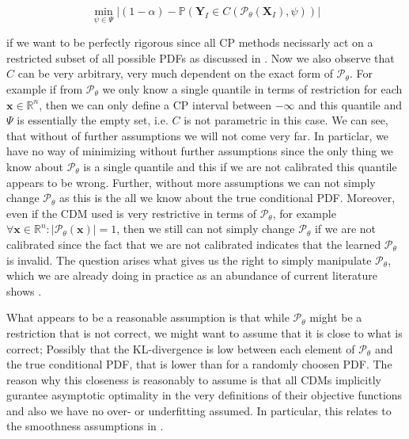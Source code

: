 \begin{equation}
    \min_{\psi \in \Psi} |(1 - \alpha) - \mathbb{P}(\mathbf{Y}_I \in C(\mathscr{P}_{\theta}(\mathbf{X}_I), \psi))|
    \label{eq:calibration_objective_formal}
\end{equation}

if we want to be perfectly rigorous since all CP methods necissarly act on a restricted subset of all possible PDFs as discussed in . Now we also observe that $C$ can be very arbitrary, very much dependent on the exact form of $\mathscr{P}_{\theta}$. For example if from $\mathscr{P}_{\theta}$ we only know a single quantile in terms of restriction for each $\mathbf{x} \in \mathbb{R}^n$, then we can only define a CP interval between $- \infty$ and this quantile and $\Psi$ is essentially the empty set, i.e. $C$ is not parametric in this case. We can see, that without of further assumptions we will not come very far. In particlar, we have no way of minimizing  without further assumptions since the only thing we know about $\mathscr{P}_\theta$ is a single quantile and this if we are not calibrated this quantile appears to be wrong. Further, without more assumptions we can not simply change $\mathscr{P}_\theta$ as this is the all we know about the true conditional PDF. Moreover, even if the CDM used is very restrictive in terms of $\mathscr{P}_{\theta}$, for example $\forall \mathbf{x}\in\mathbb{R}^n:|\mathscr{P}_{\theta}(\mathbf{x})|=1$, then we still can not simply change $\mathscr{P}_{\theta}$ if we are not calibrated since the fact that we are not calibrated indicates that the learned $\mathscr{P}_{\theta}$ is invalid. The question arises what gives us the right to simply manipulate $\mathscr{P}_{\theta}$, which we are already doing in practice as an abundance of current literature shows \cite{sesia2021conformal, chernozhukov2021distributional}.

What appears to be a reasonable assumption is that while $\mathscr{P}_{\theta}$ might be a restriction that is not correct, we might want to assume that it is close to what is correct; Possibly that the KL-divergence is low between each element of $\mathscr{P}_{\theta}$ and the true conditional PDF, that is lower than for a randomly choosen PDF. The reason why this closeness is reasonably to assume is that all CDMs implicitly gurantee asymptotic optimality in the very definitions of their objective functions and also we have no over- or underfitting assumed. In particular, this relates to the smoothness assumptions in .

